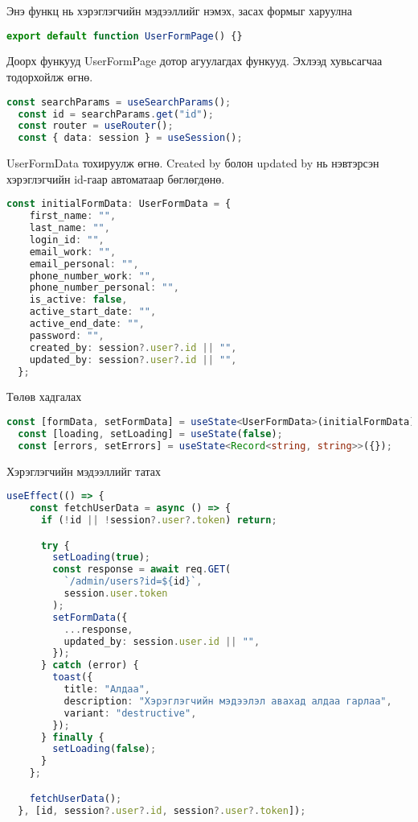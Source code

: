 Энэ функц нь хэрэглэгчийн мэдээллийг нэмэх, засах формыг харуулна
\begin{lstlisting}[language=Typescript, caption=UserFormPage функц (Main component), frame=single]
export default function UserFormPage() {}
\end{lstlisting}

Доорх функууд UserFormPage дотор агуулагдах функууд. 
Эхлээд хувьсагчаа тодорхойлж өгнө.
\begin{lstlisting}[language=Typescript, caption=Хувьсагч, frame=single]
	const searchParams = useSearchParams();
  const id = searchParams.get("id");
  const router = useRouter();
  const { data: session } = useSession();
\end{lstlisting}

UserFormData тохируулж өгнө. Created by болон updated by нь нэвтэрсэн хэрэглэгчийн id-гаар автоматаар бөглөгдөнө.

\begin{lstlisting}[language=Typescript, caption=initialFormData хоосон утга оноосон байдал, frame=single]
	const initialFormData: UserFormData = {
    first_name: "",
    last_name: "",
    login_id: "",
    email_work: "",
    email_personal: "",
    phone_number_work: "",
    phone_number_personal: "",
    is_active: false,
    active_start_date: "",
    active_end_date: "",
    password: "",
    created_by: session?.user?.id || "",
    updated_by: session?.user?.id || "",
  };
\end{lstlisting}

Төлөв хадгалах
\begin{lstlisting}[language=Typescript, caption=Төлөв хадгалах, frame=single]
	const [formData, setFormData] = useState<UserFormData>(initialFormData);
  const [loading, setLoading] = useState(false);
  const [errors, setErrors] = useState<Record<string, string>>({});
\end{lstlisting}


Хэрэглэгчийн мэдээллийг татах
\begin{lstlisting}[language=Typescript, caption=Хэрэглэгчийн мэдээлэл татах useEffect, frame=single]
	useEffect(() => {
    const fetchUserData = async () => {
      if (!id || !session?.user?.token) return;

      try {
        setLoading(true);
        const response = await req.GET(
          `/admin/users?id=${id}`,
          session.user.token
        );
        setFormData({
          ...response,
          updated_by: session.user.id || "",
        });
      } catch (error) {
        toast({
          title: "Алдаа",
          description: "Хэрэглэгчийн мэдээлэл авахад алдаа гарлаа",
          variant: "destructive",
        });
      } finally {
        setLoading(false);
      }
    };

    fetchUserData();
  }, [id, session?.user?.id, session?.user?.token]);
\end{lstlisting}

